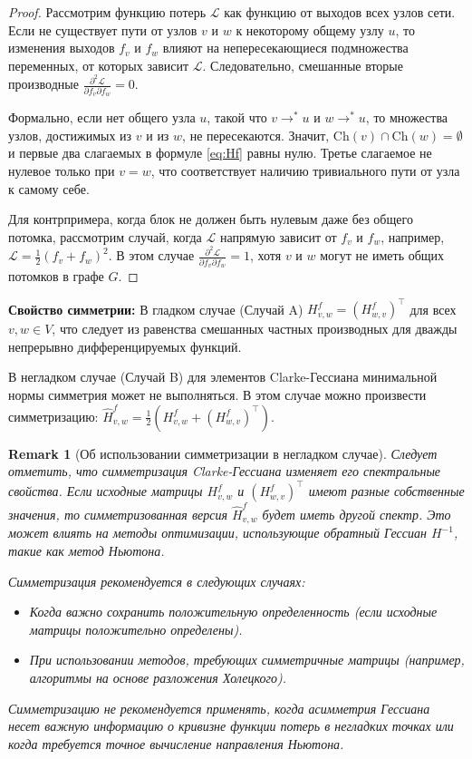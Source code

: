 \documentclass[11pt]{article}
\newtheorem{remark}{Remark}
\newcommand{\Ch}{\mathrm{Ch}} %
\begin{document}
\begin{proof}
  Рассмотрим функцию потерь $\mathcal{L}$ как функцию от выходов всех узлов сети. Если не существует пути от
  узлов $v$ и $w$ к некоторому общему узлу $u$, то изменения выходов $f_v$ и $f_w$ влияют на непересекающиеся
  подмножества переменных, от которых зависит $\mathcal{L}$. Следовательно, смешанные вторые производные
  $\frac{\partial^2 \mathcal{L}}{\partial f_v \partial f_w} = 0$.

  Формально, если нет общего узла $u$, такой что $v \rightarrow^* u$ и $w \rightarrow^* u$, то множества
  узлов, достижимых из $v$ и из $w$, не пересекаются. Значит, $\Ch(v) \cap \Ch(w) = \emptyset$ и первые два
  слагаемых в формуле \eqref{eq:Hf} равны нулю. Третье слагаемое не нулевое только при $v=w$, что
  соответствует наличию тривиального пути от узла к самому себе.

  Для контрпримера, когда блок не должен быть нулевым даже без общего потомка, рассмотрим случай, когда
  $\mathcal{L}$ напрямую зависит от $f_v$ и $f_w$, например, $\mathcal{L} = \frac{1}{2}(f_v + f_w)^2$. В этом
  случае $\frac{\partial^2 \mathcal{L}}{\partial f_v \partial f_w} = 1$, хотя $v$ и $w$ могут не иметь общих
  потомков в графе $G$.
\end{proof}

\textbf{Свойство симметрии:} В гладком случае (Случай A) $H^f_{v,w}=(H^f_{w,v})^\top$ для всех $v,w \in V$,
что следует из равенства смешанных частных производных для дважды непрерывно дифференцируемых функций.

В негладком случае (Случай B) для элементов Clarke-Гессиана минимальной нормы симметрия может не выполняться.
В этом случае можно произвести симметризацию: $\hat{H}^f_{v,w} = \frac{1}{2}(H^f_{v,w} + (H^f_{w,v})^\top)$.

\begin{remark}[Об использовании симметризации в негладком случае]
  Следует отметить, что симметризация Clarke-Гессиана изменяет его спектральные свойства. Если исходные
  матрицы $H^f_{v,w}$ и $(H^f_{w,v})^\top$ имеют разные собственные значения, то симметризованная версия
  $\hat{H}^f_{v,w}$ будет иметь другой спектр. Это может влиять на методы оптимизации, использующие обратный
  Гессиан $H^{-1}$, такие как метод Ньютона.

  Симметризация рекомендуется в следующих случаях:
  \begin{itemize}
    \item Когда важно сохранить положительную определенность (если исходные матрицы положительно определены).
    \item При использовании методов, требующих симметричные матрицы (например, алгоритмы на основе разложения
      Холецкого).
  \end{itemize}

  Симметризацию не рекомендуется применять, когда асимметрия Гессиана несет важную информацию о кривизне
  функции потерь в негладких точках или когда требуется точное вычисление направления Ньютона.
\end{remark}
\end{document}
